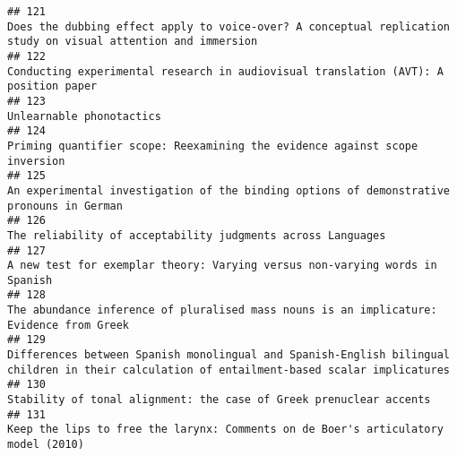 \documentclass[
  english,
  man]{apa6}
\begin{document}
\begin{verbatim}
## 121                                                                                                                            Does the dubbing effect apply to voice-over? A conceptual replication study on visual attention and immersion
## 122                                                                                                                                                      Conducting experimental research in audiovisual translation (AVT): A position paper
## 123                                                                                                                                                                                                                 Unlearnable phonotactics
## 124                                                                                                                                                               Priming quantifier scope: Reexamining the evidence against scope inversion
## 125                                                                                                                                                 An experimental investigation of the binding options of demonstrative pronouns in German
## 126                                                                                                                                                                              The reliability of acceptability judgments across Languages
## 127                                                                                                                                                              A new test for exemplar theory: Varying versus non-varying words in Spanish
## 128                                                                                                                                                  The abundance inference of pluralised mass nouns is an implicature: Evidence from Greek
## 129                                                                                              Differences between Spanish monolingual and Spanish-English bilingual children in their calculation of entailment-based scalar implicatures
## 130                                                                                                                                                                       Stability of tonal alignment: the case of Greek prenuclear accents
## 131                                                                                                                                                        Keep the lips to free the larynx: Comments on de Boer's articulatory model (2010)

\end{verbatim}
\end{document}
